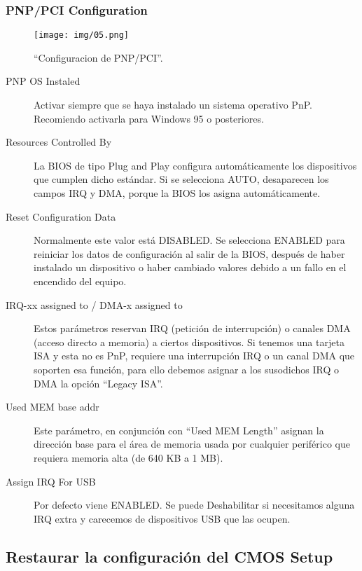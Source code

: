 \documentclass[12pt,oneside,a4paper]{article}
\begin{document}
		\subsubsection{PNP/PCI Configuration}{\label{sub:pnp/pci configuration}}
			\begin{figure}[H]
				\centering
					\texttt{[image: img/05.png]}
				\caption{``Configuracion de PNP/PCI''.}
			\end{figure}
			\begin{description}
				\item[PNP OS Instaled] Activar siempre que se haya instalado un
					sistema operativo PnP. Recomiendo activarla para Windows 95
					o posteriores.
				\item[Resources Controlled By] La BIOS de tipo Plug and Play
					configura automáticamente los dispositivos que cumplen
					dicho estándar. Si se selecciona AUTO, desaparecen los
					campos IRQ y DMA, porque la BIOS los asigna
					automáticamente.
				\item[Reset Configuration Data] Normalmente este valor está
					DISABLED. Se selecciona ENABLED para reiniciar los datos de
					configuración al salir de la BIOS, después de haber
					instalado un dispositivo o haber cambiado valores debido a
					un fallo en el encendido del equipo.
				\item[IRQ-xx assigned to / DMA-x assigned to] Estos parámetros
					reservan IRQ (petición de interrupción) o canales DMA
					(acceso directo a memoria) a ciertos dispositivos. Si
					tenemos una tarjeta ISA y esta no es PnP, requiere una
					interrupción IRQ o un canal DMA que soporten esa función,
					para ello debemos asignar a los susodichos IRQ o DMA la
					opción “Legacy ISA”.
				\item[Used MEM base addr] Este parámetro, en conjunción con
					“Used MEM Length” asignan la dirección base para el área de
					memoria usada por cualquier periférico que requiera memoria
					alta (de 640 KB a 1 MB).
				\item[Assign IRQ For USB] Por defecto viene ENABLED. Se puede
					Deshabilitar si necesitamos alguna IRQ extra y carecemos de
					dispositivos USB que las ocupen.
			\end{description}

		\newpage

	\subsection{Restaurar la configuración del CMOS Setup}{\label{sec:cmossetup/resetear-el-cmos-setup}}
\end{document}

